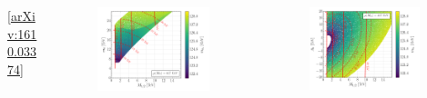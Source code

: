\documentclass[10pt,aspectratio=169]{beamer}
\begin{document}
\begin{frame}
\begin{columns}[t]
\begin{column}{0.3\textwidth}
      \vspace{-22pt}
      \begin{center}
        \tiny [\href{https://arxiv.org/abs/1610.03374}{arXiv:1610.03374}]
      \end{center}
    \end{column}
    \begin{column}{0.7\textwidth}
      \vspace{-15pt}
      \begin{columns}[t]
        \begin{column}{0.5\textwidth}
          \vspace{-32pt}
          \begin{figure}
            \hspace*{20pt}
            \includegraphics[width=0.93\textwidth]{cmssm_mupos400GeV_m12m0_Mhh}
          \end{figure}
        \end{column}
        \begin{column}{0.5\textwidth}
          \vspace{-20pt}
          \begin{figure}
            \centering
            \includegraphics[width=0.92\textwidth]{cmssm_mupos400GeV_m12A0_Mhh}

\end{figure}
\end{column}
\end{columns}
\end{column}
\end{columns}
\end{frame}
\end{document}
